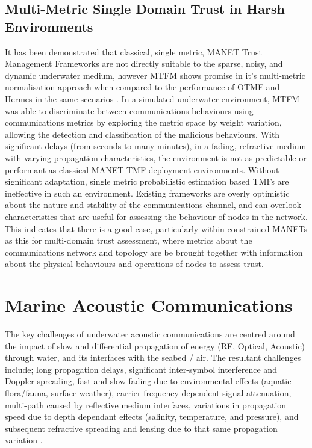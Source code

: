 \subsection{Multi-Metric Single Domain Trust in Harsh Environments}

It has been demonstrated that classical, single metric, MANET Trust Management Frameworks are not directly suitable to the sparse, noisy, and dynamic underwater medium, however MTFM shows promise in it's multi-metric normalisation approach when compared to the performance of OTMF and Hermes in the same scenarios \cite{Bolster2015b}.
In a simulated underwater environment, MTFM was able to discriminate between communications behaviours using communications metrics by exploring the metric space by weight variation, allowing the detection and classification of the malicious behaviours.
With significant delays (from seconds to many minutes), in a fading, refractive medium with varying propagation characteristics, the environment is not as predictable or performant as classical MANET TMF deployment environments. 
Without significant adaptation, single metric probabilistic estimation based TMFs are ineffective in such an environment.
Existing frameworks are overly optimistic about the nature and stability of the communications channel, and can overlook characteristics that are useful for assessing the behaviour of nodes in the network. 
This indicates that there is a good case, particularly within constrained MANETs as this for multi-domain trust assessment, where metrics about the communications network and topology are be brought together with information about the physical behaviours and operations of nodes to assess trust.




\section{Marine Acoustic Communications}

The key challenges of underwater acoustic communications are centred around the impact of slow and differential propagation of energy (RF, Optical, Acoustic) through water, and its interfaces with the seabed / air.
The resultant challenges include; long propagation delays, significant inter-symbol interference and Doppler spreading, fast and slow fading due to environmental effects (aquatic flora/fauna, surface weather), carrier-frequency dependent signal attenuation, multi-path caused by reflective medium interfaces, variations in propagation speed due to depth dependant effects (salinity, temperature, and pressure), and subsequent refractive spreading and lensing due to that same propagation variation \cite{Partan2006}.


